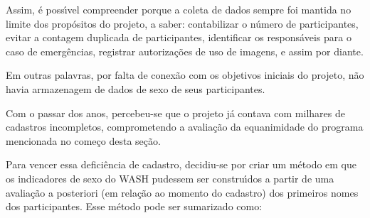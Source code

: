 \documentclass[
12pt,		%
openright,	%
twoside,  %
a4paper,			%
chapter=TITLE,		%
english,			%
french,				%
spanish,			%
brazil				%
]{USPSC-classe/USPSC}
\begin{document}
Assim, \'e poss\'{\i}vel compreender porque a coleta de dados sempre foi mantida no limite dos prop\'ositos do projeto, a saber: contabilizar o n\'umero de participantes, evitar a contagem duplicada de participantes, identificar os respons\'aveis para o caso de emerg\^encias, registrar autoriza\c{c}\~oes de uso de imagens, e assim por diante.










Em outras palavras, por falta de conex\~ao com os objetivos iniciais do projeto, n\~ao havia armazenagem de dados de sexo de seus participantes.










Com o passar dos anos, percebeu-se que o projeto j\'a contava com milhares de cadastros incompletos, comprometendo a avalia\c{c}\~ao da  equanimidade do programa mencionada no come\c{c}o desta se\c{c}\~ao.










Para vencer essa defici\^encia de cadastro, decidiu-se por criar um m\'etodo em que os indicadores de sexo do WASH pudessem ser constru\'{\i}dos a partir de uma avalia\c{c}\~ao a posteriori (em rela\c{c}\~ao ao momento do cadastro) dos primeiros nomes dos participantes. Esse m\'etodo pode ser sumarizado como:











\noindent\begin{center}\mbox{\centering{}}\end{center}
\end{document}

